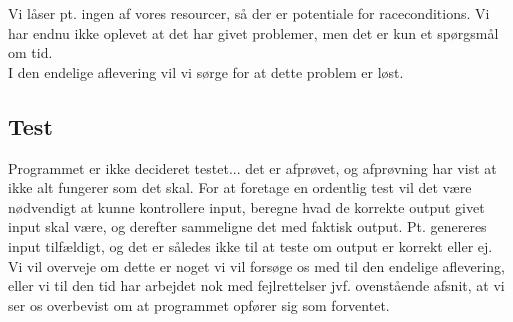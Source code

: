 \documentclass[main.tex]{subfile}
\begin{document}
Vi låser pt. ingen af vores resourcer, så der er potentiale for raceconditions. Vi har endnu ikke oplevet at det har givet problemer, men det er kun et spørgsmål om tid.\\

I den endelige aflevering vil vi sørge for at dette problem er løst.

\subsection{Test}
Programmet er ikke decideret testet... det er afprøvet, og afprøvning har vist at ikke alt fungerer som det skal. For at foretage en ordentlig test vil det være nødvendigt at kunne kontrollere input, beregne hvad de korrekte output givet input skal være, og derefter sammeligne det med faktisk output. Pt. genereres input tilfældigt, og det er således ikke til at teste om output er korrekt eller ej.\\

Vi vil overveje om dette er noget vi vil forsøge os med til den endelige aflevering, eller vi til den tid har arbejdet nok med fejlrettelser jvf. ovenstående afsnit, at vi ser os overbevist om at programmet opfører sig som forventet.
\end{document}
